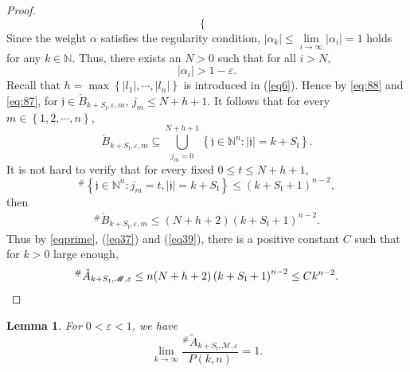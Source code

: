 \documentclass[11pt]{article}
\theoremstyle{plain}
\newtheorem{lem}[thm]{Lemma}
\theoremstyle{definition}
\begin{document}
\begin{proof}
\begin{equation}
\begin{cases}
\end{cases}
\label{eq:88}
\end{equation}
Since the weight $\alpha$ satisfies the regularity condition,   $| \alpha_{k} |\leq\lim\limits_{i\to\infty}|\alpha_i|=1 $ holds for any $k \in \mathbb{N}$. Thus, there exists an $N > 0$ such that for all $i > N$, \begin{equation}
	\left | \alpha_{i} \right | > 1 - \varepsilon.
	\label{eq:87}
\end{equation}	
Recall that $h=\max \left \{ {\left | l_{1} \right | ,\cdots ,\left | l_{n} \right |  } \right \}$ is introduced in (\ref{eq6}). Hence by \eqref{eq:88} and \eqref{eq:87}, for $\mathfrak{j} \in \check{B}  _{k+S_\mathfrak{l},\varepsilon,m }$,  $j_{m} \le N+h+1.$
It follows that for every $m\in \left \{ 1,2,\cdots,n \right \} $,
 \begin{equation}\label{eq38}
	\check{B}  _{k+S_\mathfrak{l},\varepsilon,m } \subseteq  \bigcup\limits_{j_{m}=0}^{N+h+1 } \left \{ \mathfrak{j} \in \mathbb{N}^{n}:|\mathfrak{j}|=k+S_\mathfrak{l}   \right \}.
\end{equation}
It is not hard to verify that for every fixed $0 \le t \le N+h+1$,
 \begin{equation}
	^\#\left \{ \mathfrak{j} \in \mathbb{N}^{n}:j_m=t, |\mathfrak{j}|=k+S_\mathfrak{l}   \right \}  \le \left ( k+S_\mathfrak{l}+1  \right ) ^{n-2},
\end{equation}
then \begin{eqnarray}\label{eq39}
^{\#  }\check{B}  _{k+S_\mathfrak{l},\varepsilon,m }  \le (N+h+2)\left ( k+S_\mathfrak{l}+1  \right ) ^{n-2}.\end{eqnarray}
Thus by \eqref{eqprime}, (\ref{eq37}) and (\ref{eq39}), there is a positive constant $C$ such that for $k>0$ large enough, 
\begin{equation*}
	^{\#  }	\check{A}  _{k+S_\mathfrak{l},\mathscr{M},\varepsilon }  \le n(N+h+2)\left ( k+S_\mathfrak{l}+1  \right ) ^{n-2}\leq Ck^{n-2}.  \qedhere
\end{equation*}
\end{proof}
\begin{lem}\label{lem2.7}
	For $0 < \varepsilon < 1$, we have
		$$ \lim\limits_{k\to \infty}\frac{^{\#  } \tilde{A}_{k+S_\mathfrak{l},\mathscr{M},\varepsilon } }{P(k,n) }= 1.$$
\end{lem}
\end{document}
